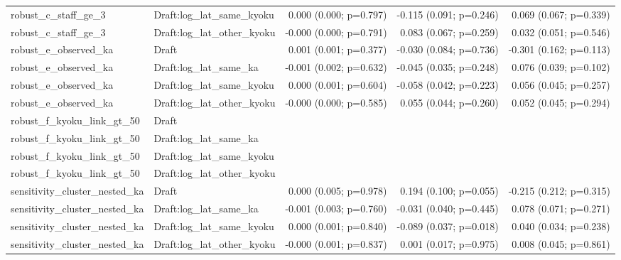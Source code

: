 \begin{table}[!htbp]
\begin{tabular}{llrrr}
\\
robust_c_staff_ge_3 & Draft:log_lat_same_kyoku & 0.000 (0.000; p=0.797) & -0.115 (0.091; p=0.246) & 0.069 (0.067; p=0.339)
\\
robust_c_staff_ge_3 & Draft:log_lat_other_kyoku & -0.000 (0.000; p=0.791) & 0.083 (0.067; p=0.259) & 0.032 (0.051; p=0.546)
\\
robust_e_observed_ka & Draft & 0.001 (0.001; p=0.377) & -0.030 (0.084; p=0.736) & -0.301 (0.162; p=0.113)
\\
robust_e_observed_ka & Draft:log_lat_same_ka & -0.001 (0.002; p=0.632) & -0.045 (0.035; p=0.248) & 0.076 (0.039; p=0.102)
\\
robust_e_observed_ka & Draft:log_lat_same_kyoku & 0.000 (0.001; p=0.604) & -0.058 (0.042; p=0.223) & 0.056 (0.045; p=0.257)
\\
robust_e_observed_ka & Draft:log_lat_other_kyoku & -0.000 (0.000; p=0.585) & 0.055 (0.044; p=0.260) & 0.052 (0.045; p=0.294)
\\
robust_f_kyoku_link_gt_50 & Draft &  &  & 
\\
robust_f_kyoku_link_gt_50 & Draft:log_lat_same_ka &  &  & 
\\
robust_f_kyoku_link_gt_50 & Draft:log_lat_same_kyoku &  &  & 
\\
robust_f_kyoku_link_gt_50 & Draft:log_lat_other_kyoku &  &  & 
\\
sensitivity_cluster_nested_ka & Draft & 0.000 (0.005; p=0.978) & 0.194 (0.100; p=0.055) & -0.215 (0.212; p=0.315)
\\
sensitivity_cluster_nested_ka & Draft:log_lat_same_ka & -0.001 (0.003; p=0.760) & -0.031 (0.040; p=0.445) & 0.078 (0.071; p=0.271)
\\
sensitivity_cluster_nested_ka & Draft:log_lat_same_kyoku & 0.000 (0.001; p=0.840) & -0.089 (0.037; p=0.018) & 0.040 (0.034; p=0.238)
\\
sensitivity_cluster_nested_ka & Draft:log_lat_other_kyoku & -0.000 (0.001; p=0.837) & 0.001 (0.017; p=0.975) & 0.008 (0.045; p=0.861)
\\
\hline
\end{tabular}
\end{table}
